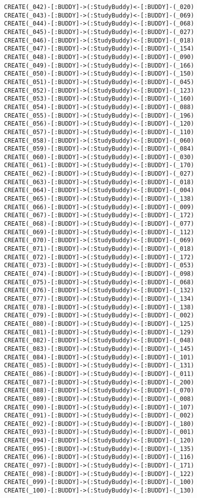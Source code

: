 \begin{lstlisting}
CREATE(_042)-[:BUDDY]->(:StudyBuddy)<-[:BUDDY]-(_020)
CREATE(_043)-[:BUDDY]->(:StudyBuddy)<-[:BUDDY]-(_069)
CREATE(_044)-[:BUDDY]->(:StudyBuddy)<-[:BUDDY]-(_068)
CREATE(_045)-[:BUDDY]->(:StudyBuddy)<-[:BUDDY]-(_027)
CREATE(_046)-[:BUDDY]->(:StudyBuddy)<-[:BUDDY]-(_018)
CREATE(_047)-[:BUDDY]->(:StudyBuddy)<-[:BUDDY]-(_154)
CREATE(_048)-[:BUDDY]->(:StudyBuddy)<-[:BUDDY]-(_090)
CREATE(_049)-[:BUDDY]->(:StudyBuddy)<-[:BUDDY]-(_166)
CREATE(_050)-[:BUDDY]->(:StudyBuddy)<-[:BUDDY]-(_150)
CREATE(_051)-[:BUDDY]->(:StudyBuddy)<-[:BUDDY]-(_045)
CREATE(_052)-[:BUDDY]->(:StudyBuddy)<-[:BUDDY]-(_123)
CREATE(_053)-[:BUDDY]->(:StudyBuddy)<-[:BUDDY]-(_160)
CREATE(_054)-[:BUDDY]->(:StudyBuddy)<-[:BUDDY]-(_088)
CREATE(_055)-[:BUDDY]->(:StudyBuddy)<-[:BUDDY]-(_196)
CREATE(_056)-[:BUDDY]->(:StudyBuddy)<-[:BUDDY]-(_120)
CREATE(_057)-[:BUDDY]->(:StudyBuddy)<-[:BUDDY]-(_110)
CREATE(_058)-[:BUDDY]->(:StudyBuddy)<-[:BUDDY]-(_060)
CREATE(_059)-[:BUDDY]->(:StudyBuddy)<-[:BUDDY]-(_084)
CREATE(_060)-[:BUDDY]->(:StudyBuddy)<-[:BUDDY]-(_030)
CREATE(_061)-[:BUDDY]->(:StudyBuddy)<-[:BUDDY]-(_170)
CREATE(_062)-[:BUDDY]->(:StudyBuddy)<-[:BUDDY]-(_027)
CREATE(_063)-[:BUDDY]->(:StudyBuddy)<-[:BUDDY]-(_018)
CREATE(_064)-[:BUDDY]->(:StudyBuddy)<-[:BUDDY]-(_004)
CREATE(_065)-[:BUDDY]->(:StudyBuddy)<-[:BUDDY]-(_138)
CREATE(_066)-[:BUDDY]->(:StudyBuddy)<-[:BUDDY]-(_009)
CREATE(_067)-[:BUDDY]->(:StudyBuddy)<-[:BUDDY]-(_172)
CREATE(_068)-[:BUDDY]->(:StudyBuddy)<-[:BUDDY]-(_077)
CREATE(_069)-[:BUDDY]->(:StudyBuddy)<-[:BUDDY]-(_112)
CREATE(_070)-[:BUDDY]->(:StudyBuddy)<-[:BUDDY]-(_069)
CREATE(_071)-[:BUDDY]->(:StudyBuddy)<-[:BUDDY]-(_018)
CREATE(_072)-[:BUDDY]->(:StudyBuddy)<-[:BUDDY]-(_172)
CREATE(_073)-[:BUDDY]->(:StudyBuddy)<-[:BUDDY]-(_053)
CREATE(_074)-[:BUDDY]->(:StudyBuddy)<-[:BUDDY]-(_098)
CREATE(_075)-[:BUDDY]->(:StudyBuddy)<-[:BUDDY]-(_068)
CREATE(_076)-[:BUDDY]->(:StudyBuddy)<-[:BUDDY]-(_132)
CREATE(_077)-[:BUDDY]->(:StudyBuddy)<-[:BUDDY]-(_134)
CREATE(_078)-[:BUDDY]->(:StudyBuddy)<-[:BUDDY]-(_138)
CREATE(_079)-[:BUDDY]->(:StudyBuddy)<-[:BUDDY]-(_002)
CREATE(_080)-[:BUDDY]->(:StudyBuddy)<-[:BUDDY]-(_125)
CREATE(_081)-[:BUDDY]->(:StudyBuddy)<-[:BUDDY]-(_129)
CREATE(_082)-[:BUDDY]->(:StudyBuddy)<-[:BUDDY]-(_048)
CREATE(_083)-[:BUDDY]->(:StudyBuddy)<-[:BUDDY]-(_145)
CREATE(_084)-[:BUDDY]->(:StudyBuddy)<-[:BUDDY]-(_101)
CREATE(_085)-[:BUDDY]->(:StudyBuddy)<-[:BUDDY]-(_131)
CREATE(_086)-[:BUDDY]->(:StudyBuddy)<-[:BUDDY]-(_011)
CREATE(_087)-[:BUDDY]->(:StudyBuddy)<-[:BUDDY]-(_200)
CREATE(_088)-[:BUDDY]->(:StudyBuddy)<-[:BUDDY]-(_070)
CREATE(_089)-[:BUDDY]->(:StudyBuddy)<-[:BUDDY]-(_008)
CREATE(_090)-[:BUDDY]->(:StudyBuddy)<-[:BUDDY]-(_107)
CREATE(_091)-[:BUDDY]->(:StudyBuddy)<-[:BUDDY]-(_002)
CREATE(_092)-[:BUDDY]->(:StudyBuddy)<-[:BUDDY]-(_180)
CREATE(_093)-[:BUDDY]->(:StudyBuddy)<-[:BUDDY]-(_001)
CREATE(_094)-[:BUDDY]->(:StudyBuddy)<-[:BUDDY]-(_120)
CREATE(_095)-[:BUDDY]->(:StudyBuddy)<-[:BUDDY]-(_135)
CREATE(_096)-[:BUDDY]->(:StudyBuddy)<-[:BUDDY]-(_116)
CREATE(_097)-[:BUDDY]->(:StudyBuddy)<-[:BUDDY]-(_171)
CREATE(_098)-[:BUDDY]->(:StudyBuddy)<-[:BUDDY]-(_122)
CREATE(_099)-[:BUDDY]->(:StudyBuddy)<-[:BUDDY]-(_100)
CREATE(_100)-[:BUDDY]->(:StudyBuddy)<-[:BUDDY]-(_130)
\end{lstlisting}


